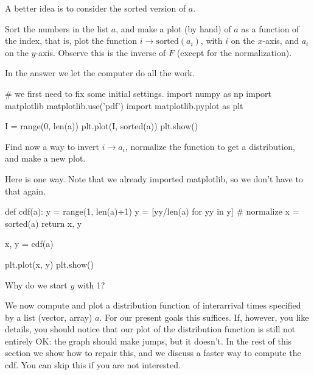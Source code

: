 \documentclass{scrartcl}
\begin{document}
A better idea is to consider the sorted version of $a$. 

\begin{exercise}
  Sort the numbers in the list $a$, and make a plot (by hand) of $a$ as a function of the index, that is, plot the function $i\to \text{sorted}(a_i)$, with $i$ on the $x$-axis, and $a_i$ on the $y$-axis.  Observe this is the inverse of $F$ (except for the normalization).
  \begin{solution}
    In the answer we let the computer do all the work.  

\begin{pyblock}
# we first need to fix some initial settings.
import numpy as np
import matplotlib
matplotlib.use('pdf') 
import matplotlib.pyplot as plt

I = range(0, len(a))
plt.plot(I, sorted(a))
plt.show()
\end{pyblock}
  \end{solution}
\end{exercise}

\begin{exercise}
  Find now a way to invert $i\to a_i$, normalize the function to get a distribution, and make a new plot. 
  \begin{solution}
Here is one way. Note that we already imported matplotlib, so we don't have to that again.
\begin{pyblock}
def cdf(a):  
    y = range(1, len(a)+1)
    y = [yy/len(a) for yy in y] # normalize
    x = sorted(a)
    return x, y

x, y = cdf(a)

plt.plot(x, y)
plt.show()
\end{pyblock}
Why do we start $y$ with 1?

  \end{solution}
\end{exercise}

We now compute and plot a distribution function of interarrival times specified by a list (vector, array) $a$. For our present goals this suffices. If, however, you like details, you should notice that our plot of the distribution function is still not entirely OK:  the graph should make  jumps, but it doesn't.  In the rest of this section we show how to repair this, and we discuss a faster way to compute the cdf. You can skip this if you are not interested. 
\end{document}

